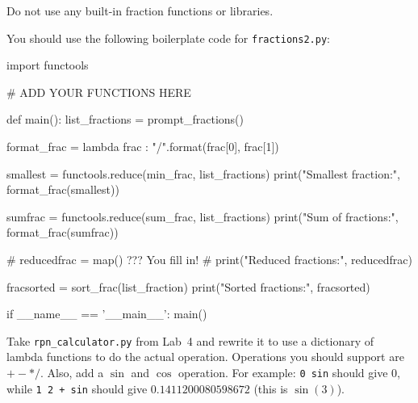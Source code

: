 \documentclass[11pt]{cselabheader}
\begin{document}
\begin{ex}[fractions2.py]
    Do not use any built-in fraction functions or libraries.

    You should use the following boilerplate code for \texttt{fractions2.py}:
    \begin{python3code}
import functools

# ADD YOUR FUNCTIONS HERE

def main():
  list_fractions = prompt_fractions()

  format_frac = lambda frac : "{}/{}".format(frac[0], frac[1])

  smallest = functools.reduce(min_frac, list_fractions)
  print("Smallest fraction:", format_frac(smallest))

  sumfrac = functools.reduce(sum_frac, list_fractions)
  print("Sum of fractions:", format_frac(sumfrac))

  # reducedfrac = map() ??? You fill in!
  # print("Reduced fractions:", reducedfrac)

  fracsorted = sort_frac(list_fraction)
  print("Sorted fractions:", fracsorted)

if __name__ == '__main__':
  main()
    \end{python3code}
  \end{ex}

  \begin{ex}[rpn.py] Take \texttt{rpn\_calculator.py} from Lab~4 and rewrite
    it to use a dictionary of lambda functions to do the actual operation.
    Operations you should support are $+ - * /$. Also, add a $\sin$ and $\cos$
    operation. For example: \texttt{0 sin} should give $0$, while
    \texttt{1 2 + sin} should give $0.1411200080598672$ (this is $\sin(3)$).
  \end{ex}

%
%
%
%
%
\end{document}
